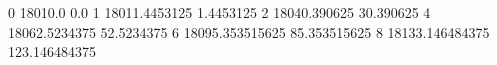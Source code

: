 0 18010.0 0.0
1 18011.4453125 1.4453125
2 18040.390625 30.390625
4 18062.5234375 52.5234375
6 18095.353515625 85.353515625
8 18133.146484375 123.146484375
